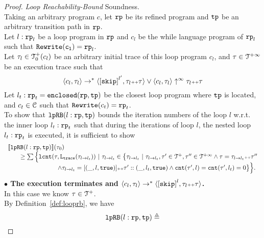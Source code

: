   \begin{proof}
  \label{proof:looprb-sound}
    \emph{Loop Reachability-Bound} Soundness.
    \\
    Taking an arbitrary program $c$, let $\mathtt{rp}$ be its refined program and $\mathtt{tp}$ be an arbitrary transition path in $\mathtt{rp}$.
    \\
    Let $l: \mathtt{rp}_l$ be a loop program in $\mathtt{rp}$ and $c_l$ be the while language program of $\mathtt{rp}_l$ such that $\mathtt{Rewrite(c_l)} = \mathtt{rp}_l$. 
    \\
    Let $\mathtt{\tau}_l \in \mathcal{T}^{+}_0(c_l)$ be an arbitrary initial trace of this loop program $c_l$, and $\mathtt{\tau} \in \mathcal{T}^{+\infty} $ be an execution trace such that
    \[
      \config{c_l, \trace_l} \to^* \config{\clabel{\eskip}^{l'}, \trace_l \tracecat \trace} \lor \config{c_l, \trace_l} \uparrow^{\infty} \trace_l \tracecat \trace 
    \]
    Let  $l_t: \mathtt{rp}_t = \mathtt{enclosed}(\mathtt{rp}, \mathtt{tp})$ be the closest loop program where $\mathtt{tp}$ is located,
  and $c_t \in \mathcal{C}$ such that $\mathtt{Rewrite}(c_t) = \mathtt{rp}_t$.
  \\
  To show that $\mathtt{lpRB}(l: \mathtt{rp}, \mathtt{tp})$ bounds the iteration numbers of the loop $l$ w.r.t.
  the inner loop $l_t: \mathtt{rp}_t$ such that during the iterations of loop $l$, the nested loop $l_t: \mathtt{rp}_t$ is executed, it is sufficient to show
    \[
      \begin{array}{l}
        \llbracket \mathtt{lpRB}(l: \mathtt{rp}, \mathtt{tp}) \rrbracket(\mathtt{\tau}_0) 
        \\ \qquad \geq 
        \sum\Big\{
          \mathtt{lcnt}(\mathtt{\tau}, \mathtt{L}_{\mathtt{{trace}}}(\mathtt{\tau}_{l \to l_t})) ~\vert~ \mathtt{\tau}_{l \to l_t} \in 
          \big\{\mathtt{\tau}_{l \to l_t} ~\vert~ 
          \mathtt{\tau}_{l \to l_t}, \mathtt{\tau}' \in \mathcal{T}^{+}, \mathtt{\tau}'' \in \mathcal{T}^{+\infty}
          \land \mathtt{\tau} = \mathtt{\tau}_{l \to l_t} {\scriptscriptstyle ++} \mathtt{\tau}''
          \\ \qquad \qquad \qquad \qquad
          \land \mathtt{\tau}_{l \to l_t} = [(\_, l, \mathtt{true})] {\scriptscriptstyle ++} \mathtt{\tau}' :: (\_, l_t, \mathtt{true})
          \land \mathtt{cnt}(\mathtt{\tau}', l) = \mathtt{cnt}(\mathtt{\tau}', l_t) = 0 
          \big\}
          \Big\}.
    \end{array}
    \]
\textbf{$\bullet$ The execution terminates and {$\config{{c_l}, \trace_l} \to^{*} \config{\clabel{\eskip}^{l}, \trace_l \tracecat \trace}$}.} 
    \\
  In this case we know $\mathtt{\tau} \in \mathcal{T}^{+}$. 
  \\
By Definition~\ref{def:looprb}, we have
\[
    \mathtt{lpRB}(l: \mathtt{rp}, \mathtt{tp}) \triangleq
\]
\end{proof}
